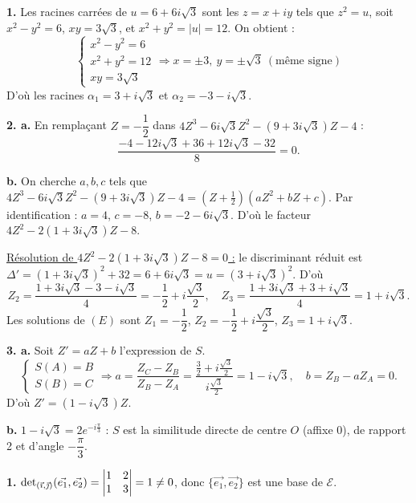 \documentclass[11pt]{article}
\begin{document}

\textbf{1.} Les racines carrées de $u = 6 + 6i\sqrt{3}$ sont les $z = x + iy$ tels que $z^2 = u$, soit $x^2 - y^2 = 6$, $xy = 3\sqrt{3}$, et $x^2 + y^2 = |u| = 12$. On obtient :
\[ \begin{cases} x^2 - y^2 = 6 \\ x^2 + y^2 = 12 \\ xy = 3\sqrt{3} \end{cases} \Rightarrow x = \pm 3,\ y = \pm\sqrt{3}\ (\text{même signe}) \]
D'où les racines $\alpha_1 = 3 + i\sqrt{3}$ et $\alpha_2 = -3 - i\sqrt{3}$.

\textbf{2. a.} En remplaçant $Z = -\dfrac{1}{2}$ dans $4Z^3 - 6i\sqrt{3}Z^2 - (9 + 3i\sqrt{3})Z - 4$ :
\[ \frac{-4 - 12i\sqrt{3} + 36 + 12i\sqrt{3} - 32}{8} = 0. \]

\textbf{b.} On cherche $a, b, c$ tels que $4Z^3 - 6i\sqrt{3}Z^2 - (9 + 3i\sqrt{3})Z - 4 = \left(Z + \tfrac{1}{2}\right)(aZ^2 + bZ + c)$. Par identification : $a = 4$, $c = -8$, $b = -2 - 6i\sqrt{3}$. D'où le facteur $4Z^2 - 2(1 + 3i\sqrt{3})Z - 8$.

\underline{Résolution de $4Z^2 - 2(1 + 3i\sqrt{3})Z - 8 = 0$ :} le discriminant réduit est $\Delta' = (1 + 3i\sqrt{3})^2 + 32 = 6 + 6i\sqrt{3} = u = (3 + i\sqrt{3})^2$. D'où
\[ Z_2 = \frac{1 + 3i\sqrt{3} - 3 - i\sqrt{3}}{4} = -\frac{1}{2} + i\frac{\sqrt{3}}{2},\quad Z_3 = \frac{1 + 3i\sqrt{3} + 3 + i\sqrt{3}}{4} = 1 + i\sqrt{3}. \]
Les solutions de $(E)$ sont $Z_1 = -\dfrac{1}{2}$, $Z_2 = -\dfrac{1}{2} + i\dfrac{\sqrt{3}}{2}$, $Z_3 = 1 + i\sqrt{3}$.

\textbf{3. a.} Soit $Z' = aZ + b$ l'expression de $S$.
\[ \begin{cases} S(A) = B \\ S(B) = C \end{cases} \Rightarrow a = \frac{Z_C - Z_B}{Z_B - Z_A} = \frac{\frac{3}{2} + i\frac{\sqrt{3}}{2}}{i\frac{\sqrt{3}}{2}} = 1 - i\sqrt{3},\quad b = Z_B - aZ_A = 0. \]
D'où $Z' = (1 - i\sqrt{3})Z$.

\textbf{b.} $1 - i\sqrt{3} = 2e^{-i\frac{\pi}{3}}$ : $S$ est la similitude directe de centre $O$ (affixe 0), de rapport 2 et d'angle $-\dfrac{\pi}{3}$.

\textbf{1.} $\det_{(\vec{\imath},\vec{\jmath})}(\vec{e_1}, \vec{e_2}) = \begin{vmatrix} 1 & 2 \\ 1 & 3 \end{vmatrix} = 1 \ne 0$, donc $\{\vec{e_1}, \vec{e_2}\}$ est une base de $\mathscr{E}$.
\end{document}

